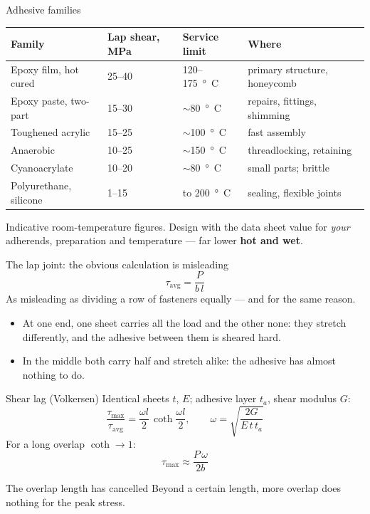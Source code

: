 \documentclass[aspectratio=169,10pt]{beamer}
\begin{document}
\begin{frame}{Adhesive families}
\centering\small
\begin{tabular}{@{}llll@{}}
\toprule
Family & Lap shear, MPa & Service limit & Where\\
\midrule
Epoxy film, hot cured & 25--40 & 120--\SI{175}{\degree C} & primary structure, honeycomb\\
Epoxy paste, two-part & 15--30 & $\sim$\SI{80}{\degree C} & repairs, fittings, shimming\\
Toughened acrylic & 15--25 & $\sim$\SI{100}{\degree C} & fast assembly\\
Anaerobic & 10--25 & $\sim$\SI{150}{\degree C} & threadlocking, retaining\\
Cyanoacrylate & 10--20 & $\sim$\SI{80}{\degree C} & small parts; brittle\\
Polyurethane, silicone & 1--15 & to \SI{200}{\degree C} & sealing, flexible joints\\
\bottomrule
\end{tabular}

\vfill
\raggedright
Indicative room-temperature figures. Design with the data sheet value for \emph{your} adherends,
preparation and temperature --- far lower \textbf{hot and wet}.
\end{frame}

\begin{frame}{The lap joint: the obvious calculation is misleading}
\[ \tau_{\text{avg}}=\frac{P}{b\,l} \]
As misleading as dividing a row of fasteners equally --- and for the same reason.

\medskip
\begin{itemize}
  \item At one end, one sheet carries all the load and the other none: they stretch differently,
        and the adhesive between them is sheared hard.
  \item In the middle both carry half and stretch alike: the adhesive has almost nothing to do.
\end{itemize}
\end{frame}

\begin{frame}{Shear lag (Volkersen)}
Identical sheets $t$, $E$; adhesive layer $t_a$, shear modulus $G$:
\[ \frac{\tau_{\max}}{\tau_{\text{avg}}}=\frac{\omega l}{2}\,\coth\frac{\omega l}{2},\qquad \omega=\sqrt{\frac{2G}{E\,t\,t_a}} \]
For a long overlap $\coth\to1$:
\[ \tau_{\max}\approx\frac{P\,\omega}{2b} \]
\vfill
\begin{alertblock}{The overlap length has cancelled}
Beyond a certain length, more overlap does nothing for the peak stress.
\end{alertblock}
\end{frame}
\end{document}
